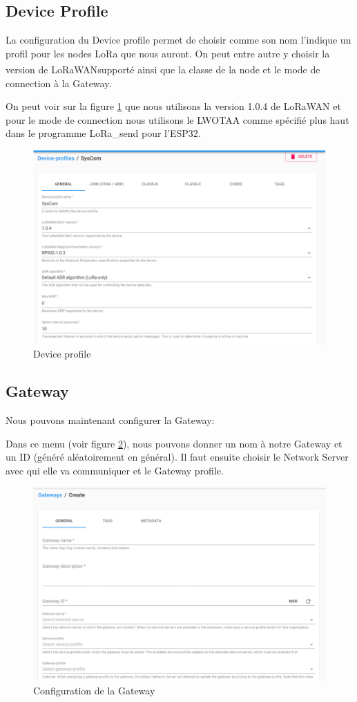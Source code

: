 \documentclass{article}
\begin{document}
		\subsection{Device Profile}
			La configuration du Device profile permet de choisir comme son nom l'indique un profil pour les nodes LoRa que nous auront.
			On peut entre autre y choisir la version de LoRaWAN\textsuperscript\textregistered supporté ainsi que la classe de la node et le mode de connection à la Gateway.
			
			On peut voir sur la figure \ref{fig:device-profile} que nous utilisons la version 1.0.4 de LoRaWAN et pour le mode de connection nous utilisons le LWOTAA comme spécifié plus haut dans le programme LoRa\_send pour l'ESP32.
						
			\begin{figure}[H]
				\centering
				\includegraphics[width=0.7\linewidth]{device-profile}
				\caption{Device profile}
				\label{fig:device-profile}
			\end{figure}
			
		\subsection{Gateway}
			Nous pouvons maintenant configurer la Gateway:
			
			Dans ce menu (voir figure \ref{fig:gateway}), nous pouvons donner un nom à notre Gateway et un ID (généré aléatoirement en général). Il faut ensuite choisir le Network Server avec qui elle va communiquer et le Gateway profile.
			\begin{figure}[H]
				\centering
				\includegraphics[width=0.7\linewidth]{gateway}
				\caption{Configuration de la Gateway}
				\label{fig:gateway}
			\end{figure}
			
\end{document}
